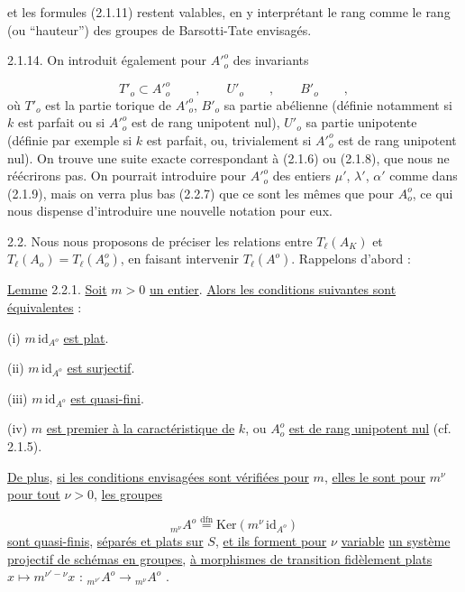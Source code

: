 
et les formules (2.1.11) restent valables, en y interprétant le rang comme le rang (ou ``hauteur'') des groupes de Barsotti-Tate envisagés.

2.1.14.  On introduit également pour ${A'}^o_o$ des invariants

\begin{equation*}
{T'}_o \subset {A'}^o_o \qquad , \qquad {U'}_o \qquad , \qquad {B'}_o \qquad ,
\end{equation*}
où ${T'}_o$ est la partie torique de ${A'}^o_o$, ${B'}_o$ sa partie abélienne (définie notamment si $k$ est parfait ou si ${A'}^o_o$ est de rang unipotent nul), ${U'}_o$ sa partie unipotente (définie par exemple si $k$ est parfait, ou, trivialement si ${A'}^o_o$ est de rang unipotent nul). On trouve une suite exacte correspondant à (2.1.6) ou (2.1.8), que nous ne réécrirons pas. On pourrait introduire pour ${A'}^o_o$ des entiers $\mu'$, $\lambda'$, $\alpha'$ comme dans (2.1.9), mais on verra plus bas (2.2.7) que ce sont les mêmes que pour $A^o_o$, ce qui nous dispense d'introduire une nouvelle notation pour eux.

2.2.  Nous nous proposons de préciser les relations entre $T_\ell(A_K)$ et $T_\ell(A_o) = T_\ell(A^o_o)$, en faisant intervenir $T_\ell(A^o)$. Rappelons d'abord :

\underline{Lemme} 2.2.1. \underline{Soit} $m > 0$ \underline{un entier}. \underline{Alors les conditions suivantes sont équivalentes} :

(i)   $m \,\mathrm{id}_{A^o}$ \underline{est plat}.

(ii)  $m \,\mathrm{id}_{A^o}$ \underline{est surjectif}.

(iii) $m \,\mathrm{id}_{A^o}$ \underline{est quasi-fini}.

(iv)  $m$ \underline{est premier à la caractéristique de} $k$, ou $A^o_o$ \underline{est de rang unipotent nul} (cf. 2.1.5).

\underline{De plus}, \underline{si les conditions envisagées sont vérifiées pour} $m$, \underline{elles le sont pour} $m^\nu$ \underline{pour tout} $\nu > 0$, \underline{les groupes}



\begin{equation*}
{}_{m^\nu}A^o \overset{\mathrm{dfn}}{=} \mathrm{Ker}(m^\nu \,\mathrm{id}_{A^o})
\end{equation*}
\underline{sont quasi-finis}, \underline{séparés et plats sur} $S$, \underline{et ils forment pour} $\nu$ \underline{variable} \underline{un système projectif de schémas en groupes}, \underline{à morphismes de transition fidèlement plats} $x \longmapsto m^{\nu'-\nu}x$ : ${}_{m^{\nu'}}A^o \longrightarrow {}_{m^\nu}A^o$ .


